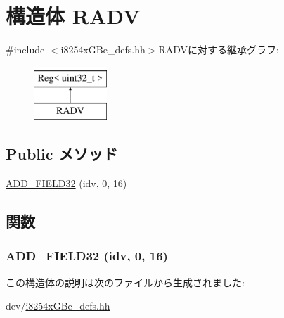 \hypertarget{structiGbReg_1_1Regs_1_1RADV}{
\section{構造体 RADV}
\label{structiGbReg_1_1Regs_1_1RADV}
}


{\ttfamily \#include $<$i8254xGBe\_\-defs.hh$>$}RADVに対する継承グラフ:\begin{figure}[H]
\begin{center}
\leavevmode
\includegraphics[height=2cm]{structiGbReg_1_1Regs_1_1RADV}
\end{center}
\end{figure}
\subsection*{Public メソッド}
\begin{DoxyCompactItemize}
\item 
\hyperlink{structiGbReg_1_1Regs_1_1RADV_adf6e0b872721f8ffd2f16c12a1b68e84}{ADD\_\-FIELD32} (idv, 0, 16)
\end{DoxyCompactItemize}


\subsection{関数}
\hypertarget{structiGbReg_1_1Regs_1_1RADV_adf6e0b872721f8ffd2f16c12a1b68e84}{
\subsubsection[{ADD\_\-FIELD32}]{\setlength{\rightskip}{0pt plus 5cm}ADD\_\-FIELD32 (idv, \/  0, \/  16)}}
\label{structiGbReg_1_1Regs_1_1RADV_adf6e0b872721f8ffd2f16c12a1b68e84}


この構造体の説明は次のファイルから生成されました:\begin{DoxyCompactItemize}
\item 
dev/\hyperlink{i8254xGBe__defs_8hh}{i8254xGBe\_\-defs.hh}\end{DoxyCompactItemize}
